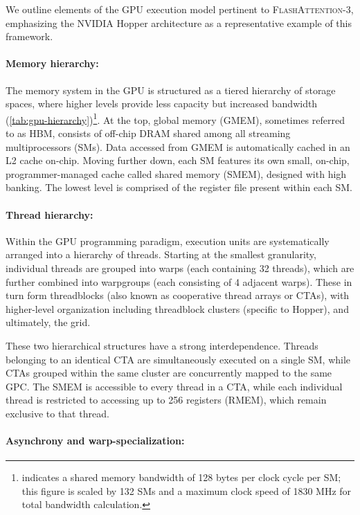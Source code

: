 We outline elements of the GPU execution model pertinent to \textsc{FlashAttention-3}, emphasizing the NVIDIA Hopper architecture as a representative example of this framework.

\paragraph{Memory hierarchy:} The memory system in the GPU is structured as a tiered hierarchy of storage spaces, where higher levels provide less capacity but increased bandwidth (\cref{tab:gpu-hierarchy})\footnote{\citet{luo2024benchmarking} indicates a shared memory bandwidth of 128 bytes per clock cycle per SM; this figure is scaled by 132 SMs and a maximum clock speed of 1830 MHz for total bandwidth calculation.}. At the top, global memory (GMEM), sometimes referred to as HBM, consists of off-chip DRAM shared among all streaming multiprocessors (SMs). Data accessed from GMEM is automatically cached in an L2 cache on-chip. Moving further down, each SM features its own small, on-chip, programmer-managed cache called shared memory (SMEM), designed with high banking. The lowest level is comprised of the register file present within each SM.

\paragraph{Thread hierarchy:} Within the GPU programming paradigm, execution units are systematically arranged into a hierarchy of threads. Starting at the smallest granularity, individual threads are grouped into warps (each containing 32 threads), which are further combined into warpgroups (each consisting of 4 adjacent warps). These in turn form threadblocks (also known as cooperative thread arrays or CTAs), with higher-level organization including threadblock clusters (specific to Hopper), and ultimately, the grid.

These two hierarchical structures have a strong interdependence. Threads belonging to an identical CTA are simultaneously executed on a single SM, while CTAs grouped within the same cluster are concurrently mapped to the same GPC. The SMEM is accessible to every thread in a CTA, while each individual thread is restricted to accessing up to 256 registers (RMEM), which remain exclusive to that thread.

\paragraph{Asynchrony and warp-specialization:}

